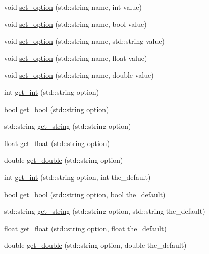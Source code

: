 \textbf{ }\par
\begin{DoxyCompactItemize}
\item 
void \hyperlink{classoptions_a3c23831e4218f9a88cddc81337518046}{set\+\_\+option} (std\+::string name, int value)
\item 
void \hyperlink{classoptions_ad2b98890aee35b50534117b34617a43f}{set\+\_\+option} (std\+::string name, bool value)
\item 
void \hyperlink{classoptions_a6f76ed6506014e816802739221cfbc20}{set\+\_\+option} (std\+::string name, std\+::string value)
\item 
void \hyperlink{classoptions_a076c522b99fc0816c695c7405e1ae9b9}{set\+\_\+option} (std\+::string name, float value)
\item 
void \hyperlink{classoptions_a42eb183c3fd8156c226559663893bb92}{set\+\_\+option} (std\+::string name, double value)
\end{DoxyCompactItemize}

\textbf{ }\par
\begin{DoxyCompactItemize}
\item 
int \hyperlink{classoptions_a797bc1915004bdbc34c5eea3fe488952}{get\+\_\+int} (std\+::string option)
\item 
bool \hyperlink{classoptions_a99aa190102de33e2aed39723929f9fad}{get\+\_\+bool} (std\+::string option)
\item 
std\+::string \hyperlink{classoptions_aeb84be21a30b0dd41d7d9f3f52c0f3f7}{get\+\_\+string} (std\+::string option)
\item 
float \hyperlink{classoptions_a31607533d0c6d2fa331f4e7f52d34bc8}{get\+\_\+float} (std\+::string option)
\item 
double \hyperlink{classoptions_a0e8ff0d44b9192754451f9dcd47cd559}{get\+\_\+double} (std\+::string option)
\end{DoxyCompactItemize}

\textbf{ }\par
\begin{DoxyCompactItemize}
\item 
int \hyperlink{classoptions_a0a17d018f4b64f85091f3ec21de029f0}{get\+\_\+int} (std\+::string option, int the\+\_\+default)
\item 
bool \hyperlink{classoptions_a9ce5a1af62eeb42a88a1b47f5891e247}{get\+\_\+bool} (std\+::string option, bool the\+\_\+default)
\item 
std\+::string \hyperlink{classoptions_ae03327a8846e4acb3986b5a6d79b3790}{get\+\_\+string} (std\+::string option, std\+::string the\+\_\+default)
\item 
float \hyperlink{classoptions_a113445829763eaa7b86cdc40c2d66e25}{get\+\_\+float} (std\+::string option, float the\+\_\+default)
\item 
double \hyperlink{classoptions_aa78e7d95dc59a2d25987546cdbab7872}{get\+\_\+double} (std\+::string option, double the\+\_\+default)
\end{DoxyCompactItemize}

